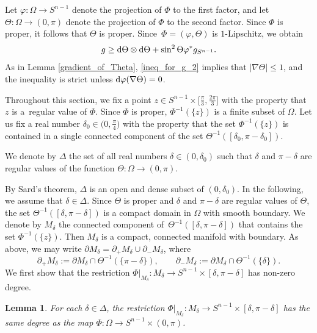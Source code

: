 \documentclass[pdftex]{sigma}
\numberwithin{equation}{section}
\newtheorem{Lemma}[Theorem]{Lemma}
\begin{document}
Let $\varphi\colon \Omega \to S^{n-1}$ denote the projection of $\Phi$ to the first factor, and let $\Theta\colon \Omega \to (0,\pi)$ denote the projection of $\Phi$ to the second factor. Since $\Phi$ is proper, it follows that $\Theta$ is proper. Since~${\Phi = (\varphi,\Theta)}$ is $1$-Lipschitz, we obtain
\begin{equation} \label{ineq_for_g_2}
 g \geq {\rm d}\Theta \otimes {\rm d}\Theta + \sin^2 \Theta \varphi^* g_{S^{n-1}}.
\end{equation}
As in Lemma \ref{gradient_of_Theta}, \eqref{ineq_for_g_2} implies that $|\nabla \Theta| \leq 1$, and the inequality is strict unless ${\rm d}\varphi(\nabla \Theta) = 0$.

Throughout this section, we fix a point $z \in S^{n-1} \times \big[\frac{\pi}{3},\frac{2\pi}{3}\big]$ with the property that $z$ is a~regular value of $\Phi$. Since $\Phi$ is proper, $\Phi^{-1}(\{z\})$ is a finite subset of $\Omega$.
Let us fix a real number $\delta_0 \in \big(0,\frac{\pi}{4}\big)$ with the property that the set $\Phi^{-1}(\{z\})$ is contained in a single connected component of the set $\Theta^{-1}([\delta_0,\pi-\delta_0])$.

\begin{Definition}
We denote by $\Delta$ the set of all real numbers $\delta \in (0,\delta_0)$ such that $\delta$ and $\pi-\delta$ are regular values of the function $\Theta\colon \Omega \to (0,\pi)$.
\end{Definition}

By Sard's theorem, $\Delta$ is an open and dense subset of $(0,\delta_0)$.
In the following, we assume that $\delta \in \Delta$. Since $\Theta$ is proper and $\delta$ and $\pi-\delta$ are regular values of $\Theta$, the set $\Theta^{-1}([\delta,\pi-\delta])$ is a compact domain in $\Omega$ with smooth boundary. We denote by $M_\delta$ the connected component of~$\Theta^{-1}([\delta,\pi-\delta])$ that contains the set $\Phi^{-1}(\{z\})$.
Then $M_\delta$ is a compact, connected manifold with boundary.
As above, we may write $\partial M_\delta = \partial_+ M_\delta \cup \partial_- M_\delta$, where
\[\partial_+ M_\delta := \partial M_\delta \cap \Theta^{-1}(\{\pi-\delta\}), \qquad \partial_- M_\delta := \partial M_\delta \cap \Theta^{-1}(\{\delta\}).\]
We first show that the restriction $\Phi|_{M_\delta}\colon M_\delta \to S^{n-1} \times [\delta,\pi-\delta]$ has non-zero degree.

\begin{Lemma}
\label{degree_of_restriction_2}
For each $\delta \in \Delta$, the restriction $\Phi|_{M_\delta}\colon M_\delta \to S^{n-1} \times [\delta,\pi-\delta]$ has the same degree as the map $\Phi\colon \Omega \to S^{n-1} \times (0,\pi)$.
\end{Lemma}
\end{document}
